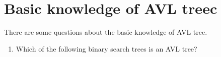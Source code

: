 \documentclass[11pt]{exam}
\begin{document}
\section{Basic knowledge of AVL treec}
There are some questions about the basic knowledge of AVL tree.
\begin{enumerate}
\item Which of the following binary search trees is an AVL tree?
\begin{figure}[H]
     \centering
     \hspace{0.5in} 

\end{figure}
\end{enumerate}
\end{document}
